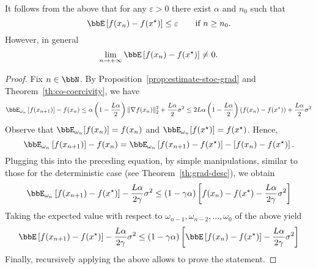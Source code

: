      \begin{remark}
         It follows from the above that for any $\varepsilon>0$ there exist $\alpha$ and $n_0$ such that
         \begin{equation}
             \bbE\left[ f(x_n)-f(x^\star) \right] \le \varepsilon \qquad \text{if }n\ge n_0.
         \end{equation}
         However, in general
         \begin{equation}
             \lim_{n\to +\infty} \bbE\left[ f(x_n)-f(x^\star) \right] \neq 0.
         \end{equation}
     \end{remark}
 
     \begin{proof}
         Fix $n\in\bbN$.
         By Proposition~\ref{prop:estimate-stoc-grad} and Theorem~\ref{th:co-coercivity}, we have
         \begin{equation}
             \bbE_{\omega_n}\left[ f(x_{n+1}) \right] -f(x_n)
             \le	\alpha\left( 1 - \frac{L\alpha}{2}\right)\|\nabla f(x_n)\|_2^2+\frac{L\alpha}{2}\sigma^2
             \le	2L\alpha\left( 1 - \frac{L\alpha}{2}\right)(f(x_n)-f(x^\star))+\frac{L\alpha}{2}\sigma^2
         \end{equation}
         Observe that $\bbE_{\omega_n}[f(x_n)]=f(x_n)$ and $\bbE_{\omega_n}[f(x^\star)]=f(x^\star)$. Hence,
         \begin{equation}
             \bbE_{\omega_n}\left[ f(x_{n+1}) \right] -f(x_n) = \bbE_{\omega_n}\left[ f(x_{n+1}) -f(x^\star)\right] -\left[f(x_n) - f(x^\star) \right].
         \end{equation}
         Plugging this into the preceding equation, by simple manipulations, similar to those for the deterministic case (see Theorem~\ref{th:grad-desc}), we obtain
         \begin{equation}
             \bbE_{\omega_n}\left[ f(x_{n+1}) -f(x^\star)\right]	-\frac{L\alpha}{2\gamma} \sigma^2 \le (1-\gamma\alpha)\left[  f(x_{n}) -f(x^\star)	-\frac{L\alpha}{2\gamma} \sigma^2 \right]
         \end{equation}
         Taking the expected value with respect to $\omega_{n-1}, \omega_{n-2},\ldots, \omega_0$ of the above yield
         \begin{equation}
             \label{eq:ciao}
             \bbE\left[ f(x_{n+1}) -f(x^\star)\right]	-\frac{L\alpha}{2\gamma} \sigma^2 \le (1-\gamma\alpha)\left[  \bbE\left[f(x_{n}) -f(x^\star)\right]	-\frac{L\alpha}{2\gamma} \sigma^2 \right]
         \end{equation}
         Finally, recursively applying the above allows to prove the statement.
     \end{proof}
 
